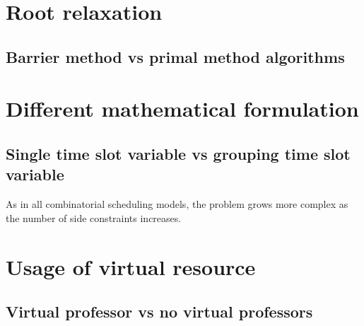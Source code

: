 \section{Root relaxation}

\subsection{Barrier method vs primal method algorithms}




\section{Different mathematical formulation}

\subsection{Single time slot variable vs grouping time slot variable}



As in all combinatorial scheduling models, the problem grows more complex as the number of side constraints increases.



\section{Usage of virtual resource}

\subsection{Virtual professor vs no virtual professors}

